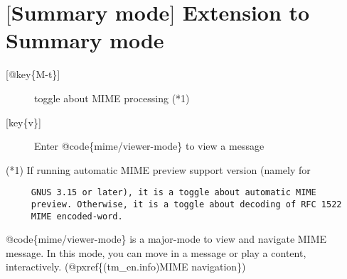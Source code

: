 \section{$[$Summary mode$]$ Extension to Summary mode}
\medskip
\begin{description}
\item[{[}@key\{M-t\}{]}]toggle about MIME processing (*1)
\medskip
\item[{[}key\{v\}{]}]Enter @code\{mime/viewer-mode\} to view a message
\medskip
\end{description}
\par
(*1) If running automatic MIME preview support version (namely for
{\baselineskip=10pt
\begin{verbatim}
     GNUS 3.15 or later), it is a toggle about automatic MIME
     preview. Otherwise, it is a toggle about decoding of RFC 1522
     MIME encoded-word.
\end{verbatim}}
\medskip
\par
@code\{mime/viewer-mode\} is a major-mode to view and navigate MIME
message. In this mode, you can move in a message or play a content,
interactively. (@pxref\{(tm\_en.info)MIME navigation\})
\medskip
\medskip

